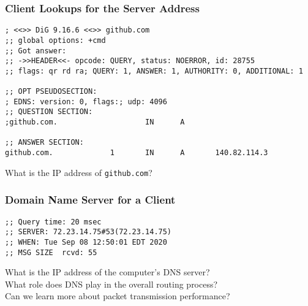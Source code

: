\documentclass[14pt,aspectratio=169]{beamer}
\begin{document}
%
\begin{frame}[fragile]
  \frametitle{Client Lookups for the Server Address}
  \normalsize
  \hspace*{-.2in}
  \begin{minipage}{6in}
    \vspace*{.15in}
    \begin{verbatim}
; <<>> DiG 9.16.6 <<>> github.com
;; global options: +cmd
;; Got answer:
;; ->>HEADER<<- opcode: QUERY, status: NOERROR, id: 28755
;; flags: qr rd ra; QUERY: 1, ANSWER: 1, AUTHORITY: 0, ADDITIONAL: 1

;; OPT PSEUDOSECTION:
; EDNS: version: 0, flags:; udp: 4096
;; QUESTION SECTION:
;github.com.                    IN      A

;; ANSWER SECTION:
github.com.             1       IN      A       140.82.114.3
    \end{verbatim}
  \end{minipage}
  \vspace*{0in}
  \begin{center}
    \normalsize \noindent What is the IP address of {\tt github.com}? \\
  \end{center}
\end{frame}

%
\begin{frame}[fragile]
  \frametitle{Domain Name Server for a Client}
  \normalsize
  \hspace*{.15in}
  \begin{minipage}{6in}
    \vspace*{.25in}
    \begin{verbatim}
;; Query time: 20 msec
;; SERVER: 72.23.14.75#53(72.23.14.75)
;; WHEN: Tue Sep 08 12:50:01 EDT 2020
;; MSG SIZE  rcvd: 55
    \end{verbatim}
  \end{minipage}
  \vspace*{.25in}
  \begin{center}
    \normalsize \noindent What is the IP address of the computer's DNS server? \\
    \normalsize \noindent What role does DNS play in the overall routing process? \\
    \normalsize \noindent Can we learn more about packet transmission performance? \\
  \end{center}
\end{frame}
\end{document}
